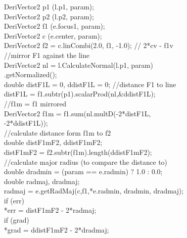 \documentclass[12pt,twoside,a4paper]{book}
\begin{document}
    \begin{codequote}
    DeriVector2 p1 (l.p1, param);\\
    DeriVector2 p2 (l.p2, param);\\
    DeriVector2 f1 (e.focus1, param);\\
    DeriVector2 c (e.center, param);\\
    DeriVector2 f2 = c.linCombi(2.0, f1, -1.0); // 2*cv - f1v\\

    //mirror F1 against the line \\
    DeriVector2 nl = l.CalculateNormal(l.p1, param)\\
    \-\hspace{3cm}.getNormalized();\\

    double distF1L = 0, ddistF1L = 0; //distance F1 to line\\

    distF1L = f1.subtr(p1).scalarProd(nl,\&ddistF1L);\\

    //f1m = f1 mirrored\\
    DeriVector2 f1m = f1.sum(nl.multD(-2*distF1L, \\
    \-\hspace{6.7cm}-2*ddistF1L));\\

    //calculate distance form f1m to f2\\
    double distF1mF2, ddistF1mF2;\\
    distF1mF2 = f2.subtr(f1m).length(ddistF1mF2);\\

    //calculate major radius (to compare the distance to)\\
    double dradmin = (param == e.radmin) ? 1.0 : 0.0;\\
    double radmaj, dradmaj;\\
    radmaj = e.getRadMaj(c,f1,*e.radmin, dradmin, dradmaj);\\

    if (err)\\
    \-\hspace{0.5cm}*err = distF1mF2 - 2*radmaj;\\
    if (grad)\\
    \-\hspace{0.5cm}*grad = ddistF1mF2 - 2*dradmaj;\\
    \end{codequote}
\end{document}
